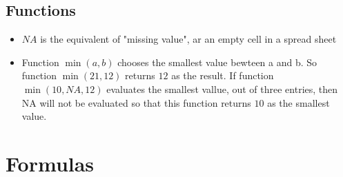 \documentclass[11pt,a4paper,fleqn]{article}      %
\begin{document}
\subsection{Functions}
\label{sec:funct}

\begin{itemize}
\item $NA$ is the equivalent of "missing value", ar an empty cell in a spread sheet
\item Function $\min(a,b)$ chooses the smallest value bewteen a and b. So function $\min(21,12)$ returns $12$ as the result. If function $\min(10,NA,12)$ evaluates the smallest vallue, out of three entries, then NA will not be evaluated so that this function returns $10$ as the smallest value. 
\end{itemize}


\section{Formulas}
\end{document}

